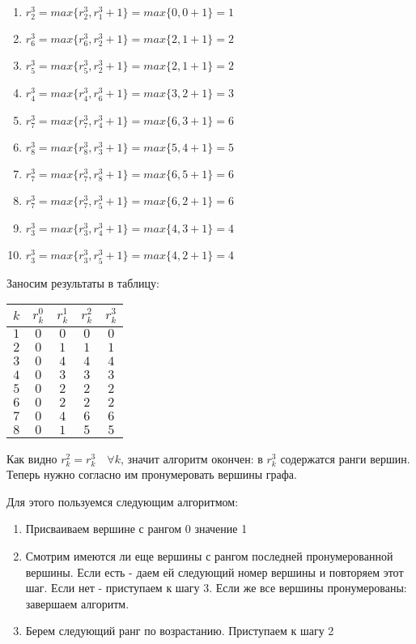 \begin{enumerate}[nosep]
	\item $r_2^3 = max\{r_2^3, r_1^3 + 1\} = max\{0,0+1\} = 1$
	\item $r_6^3 = max\{r_6^3, r_2^3 + 1\} = max\{2,1+1\} = 2$
	\item $r_5^3 = max\{r_5^3, r_2^3 + 1\} = max\{2,1+1\} = 2$
	\item $r_4^3 = max\{r_4^3, r_6^3 + 1\} = max\{3,2+1\} = 3$
	\item $r_7^3 = max\{r_7^3, r_4^3 + 1\} = max\{6,3+1\} = 6$
	\item $r_8^3 = max\{r_8^3, r_3^3 + 1\} = max\{5,4+1\} = 5$
	\item $r_7^3 = max\{r_7^3, r_8^3 + 1\} = max\{6,5+1\} = 6$
	\item $r_7^3 = max\{r_7^3, r_5^3 + 1\} = max\{6,2+1\} = 6$
	\item $r_3^3 = max\{r_3^3, r_4^3 + 1\} = max\{4,3+1\} = 4$
	\item $r_3^3 = max\{r_3^3, r_5^3 + 1\} = max\{4,2+1\} = 4$
\end{enumerate}

Заносим результаты в таблицу:

\begin{table}[H]
	\centering
	\begin{tabular}{ | c | c | c | c | c | } 
		\hline
		$k$ & $r_k^0$ & $r_k^1$ & $r_k^2$ & $r_k^3$ \\ \hline
		$1$ & $0$ & $0$ & $0$ & $0$ \\ \hline
		$2$ & $0$ & $1$ & $1$ & $1$ \\ \hline
		$3$ & $0$ & $4$ & $4$ & $4$ \\ \hline
		$4$ & $0$ & $3$ & $3$ & $3$ \\ \hline
		$5$ & $0$ & $2$ & $2$ & $2$ \\ \hline
		$6$ & $0$ & $2$ & $2$ & $2$ \\ \hline
		$7$ & $0$ & $4$ & $6$ & $6$ \\ \hline
		$8$ & $0$ & $1$ & $5$ & $5$ \\ \hline
	\end{tabular}
\end{table}

Как видно $r_k^2 = r_k^3 \quad \forall k$, значит алгоритм окончен: в $r^3_k$ содержатся ранги вершин. Теперь нужно согласно им пронумеровать вершины графа.

Для этого пользуемся следующим алгоритмом:

\begin{enumerate}[nosep]
	\item Присваиваем вершине с рангом 0 значение 1
	\item Смотрим имеются ли еще вершины с рангом последней пронумерованной вершины. Если есть - даем ей следующий номер вершины и повторяем этот шаг. Если нет - приступаем к шагу 3. Если же все вершины пронумерованы: завершаем алгоритм.
	\item Берем следующий ранг по возрастанию. Приступаем к шагу 2
\end{enumerate}


